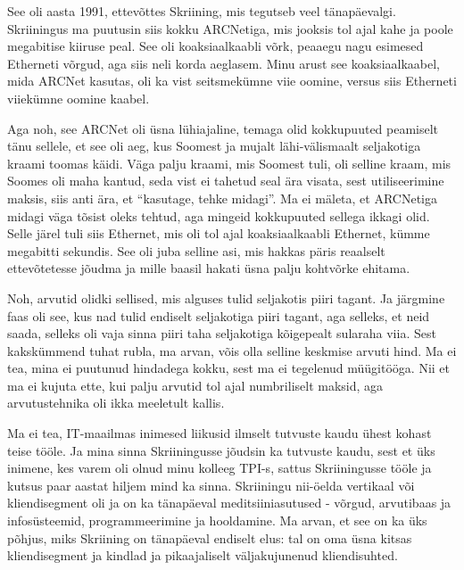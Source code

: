 
See oli  aasta 1991, ettevõttes Skriining, mis 
tegutseb veel tänapäevalgi. Skriiningus ma puutusin siis kokku ARCNetiga, mis jooksis 
tol ajal kahe ja poole megabitise kiiruse peal. See oli koaksiaalkaabli võrk, 
peaaegu nagu esimesed Etherneti võrgud, aga siis neli korda aeglasem. Minu 
arust see koaksiaalkaabel, mida ARCNet kasutas, oli ka vist seitsmekümne viie 
oomine, versus siis Etherneti viiekümne oomine kaabel. 

Aga noh, see ARCNet oli  üsna lühiajaline, temaga olid kokkupuuted peamiselt  
tänu sellele, et see oli  aeg, kus Soomest ja mujalt lähi-välismaalt 
seljakotiga kraami toomas käidi. Väga palju kraami, mis Soomest tuli, oli 
selline kraam, mis Soomes oli maha kantud, seda vist ei tahetud seal ära visata, 
sest  utiliseerimine maksis, siis anti ära, et \enquote{kasutage, tehke 
midagi}. Ma ei mäleta, et ARCNetiga midagi väga tõsist oleks tehtud, aga 
mingeid kokkupuuted sellega ikkagi olid. Selle järel tuli siis Ethernet, mis 
oli tol ajal koaksiaalkaabli Ethernet, kümme megabitti sekundis. See oli juba 
selline asi, mis hakkas päris reaalselt ettevõtetesse jõudma ja mille baasil 
hakati  üsna palju  kohtvõrke ehitama.


Noh, arvutid olidki sellised, mis alguses tulid seljakotis piiri tagant. Ja 
järgmine faas oli see, kus  nad tulid endiselt seljakotiga piiri tagant, aga 
selleks, et neid saada, selleks oli vaja sinna piiri taha seljakotiga 
kõigepealt sularaha viia. Sest kakskümmend tuhat rubla, ma arvan, võis olla  
selline keskmise arvuti hind. Ma ei tea, mina ei puutunud hindadega kokku, sest 
ma ei tegelenud müügitööga. Nii et ma ei kujuta ette, kui palju  arvutid tol 
ajal  numbriliselt maksid, aga arvutustehnika oli ikka meeletult kallis.


Ma ei tea, IT-maailmas inimesed liikusid ilmselt tutvuste kaudu ühest kohast 
teise tööle. Ja mina sinna Skriiningusse jõudsin ka  tutvuste 
kaudu, sest et üks inimene, kes varem oli olnud minu kolleeg TPI-s, sattus 
Skriiningusse tööle ja kutsus paar aastat hiljem mind ka sinna. 
Skriiningu nii-öelda vertikaal või kliendisegment oli ja on ka tänapäeval 
meditsiiniasutused - võrgud, arvutibaas ja infosüsteemid, 
programmeerimine ja hooldamine. Ma arvan, et see on ka üks põhjus, miks 
Skriining on tänapäeval  endiselt elus: tal on oma 
üsna kitsas kliendisegment ja kindlad ja pikaajaliselt väljakujunenud kliendisuhted.

